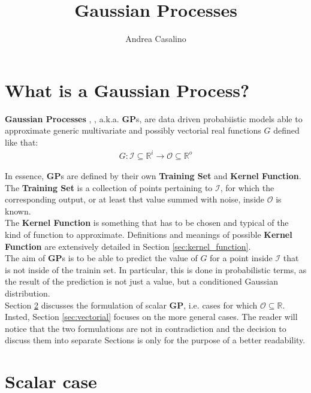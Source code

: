 \documentclass{article}
\author{Andrea Casalino}
\title{Gaussian Processes}
\begin{document}
\maketitle

\newpage
\section{What is a Gaussian Process?}

\textbf{Gaussian Processes} \cite{GP_general_01}, \cite{GP_general_02}, a.k.a. \textbf{GP}s, are
data driven probabiistic models able to approximate generic multivariate and possibly vectorial real functions $G$ defined like that:
\begin{eqnarray}
G : \mathcal{I} \subseteq \mathbb{R}^i \rightarrow \mathcal{O} \subseteq \mathbb{R}^o
\end{eqnarray}

In essence, \textbf{GP}s are defined by their own \textbf{Training Set} and \textbf{Kernel Function}.
The \textbf{Training Set} is a collection of points pertaining to $\mathcal{I}$, for which the corresponding output, or at least thst value summed with noise, inside $\mathcal{O}$ is known.
\\
The \textbf{Kernel Function} is something that has to be chosen and typical of the kind of function to approximate. Definitions and meanings of possible \textbf{Kernel Function} are extensively detailed in Section \ref{sec:kernel_function}.
\\
The aim of \textbf{GP}s is to be able to predict the value of $G$ for a point inside $\mathcal{I}$ that is not inside of the trainin set. In particular, this is done in probabilistic terms, as the result of the prediction is not just a value, but a conditioned Gaussian distribution.
\\
Section \ref{sec:scalar} discusses the formulation of scalar \textbf{GP}, i.e. cases for which $\mathcal{O} \subseteq \mathbb{R}$. Insted, Section \ref{sec:vectorial} focuses on the more general cases. The reader will notice that the two formulations are not in contradiction and the decision to discuss them into separate Sections is only for the purpose of a better readability. 

\section{Scalar case}
\label{sec:scalar}
\end{document}
